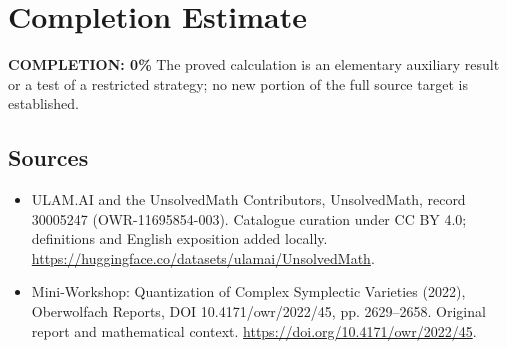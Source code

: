 \documentclass[11pt]{article}
\begin{document}
\section{Completion Estimate}
\noindent\textbf{COMPLETION: 0\%}
The proved calculation is an elementary auxiliary result or a test of a restricted strategy; no new portion of the full source target is established.

\subsection{Sources}
\begin{itemize}
\item[\hypertarget{source:30005247:1}{S1}] ULAM.AI and the UnsolvedMath Contributors, UnsolvedMath, record 30005247 (OWR-11695854-003). Catalogue curation under CC BY 4.0; definitions and English exposition added locally.
\url{https://huggingface.co/datasets/ulamai/UnsolvedMath}.
\item[\hypertarget{source:30005247:2}{S2}] Mini-Workshop: Quantization of Complex Symplectic Varieties (2022), Oberwolfach Reports, DOI 10.4171/owr/2022/45, pp. 2629--2658. Original report and mathematical context.
\url{https://doi.org/10.4171/owr/2022/45}.
\end{itemize}
\label{end:30005247}
\end{document}

